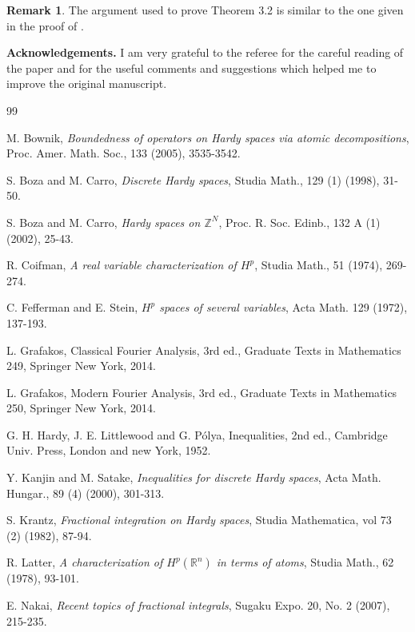 \documentclass[leqno,12pt]{article} %
\theoremstyle{plain} %
\theoremstyle{definition} %
\newtheorem{remark}[theorem]{\indent\sc Remark}
\begin{document}
\begin{remark}
The argument used to prove Theorem 3.2 is similar to the one given in the proof of \cite[Theorem 2.4.5, see p. 140-141]{Grafakos}.
\end{remark}

{\bf Acknowledgements.} I am very grateful to the referee for the careful reading of the paper and for the useful comments and suggestions which helped me to improve the original manuscript.

\begin{thebibliography}{99}

 M. Bownik, {\it Boundedness of operators on Hardy spaces via atomic decompositions}, Proc. Amer. Math. Soc., 133 (2005), 
3535-3542.

 S. Boza and M. Carro, {\it Discrete Hardy spaces}, Studia Math., 129 (1) (1998), 31-50.

 S. Boza and M. Carro, {\it Hardy spaces on $\mathbb{Z}^N$}, Proc. R. Soc. Edinb., 132 A (1) (2002), 25-43.

 R. Coifman, {\it A real variable characterization of $H^{p}$}, Studia Math., 51 (1974), 269-274.

 C. Fefferman and E. Stein, {\it $H^p$ spaces of several variables}, Acta Math. 129 (1972), 137-193.

 L. Grafakos, Classical Fourier Analysis, 3rd ed., Graduate Texts in Mathematics 249, Springer New York, 2014.

 L. Grafakos, Modern Fourier Analysis, 3rd ed., Graduate Texts in Mathematics 250, Springer New York, 2014.

 G. H. Hardy, J. E. Littlewood and G. P\'olya, Inequalities, 2nd ed., Cambridge Univ. Press, London and new York, 1952.

 Y. Kanjin and M. Satake, {\it Inequalities for discrete Hardy spaces}, Acta Math. Hungar., 89 (4) (2000), 301-313.

 S. Krantz, {\it Fractional integration on Hardy spaces}, Studia Mathematica, vol 73 (2) (1982), 87-94.

 R. Latter, {\it A characterization of $H^{p}(\mathbb{R}^{n})$ in terms of atoms}, Studia Math., 62 (1978), 93-101.

 E. Nakai, {\it Recent topics of fractional integrals}, Sugaku Expo. 20, No. 2 (2007), 215-235. 


\end{thebibliography}
\end{document}

